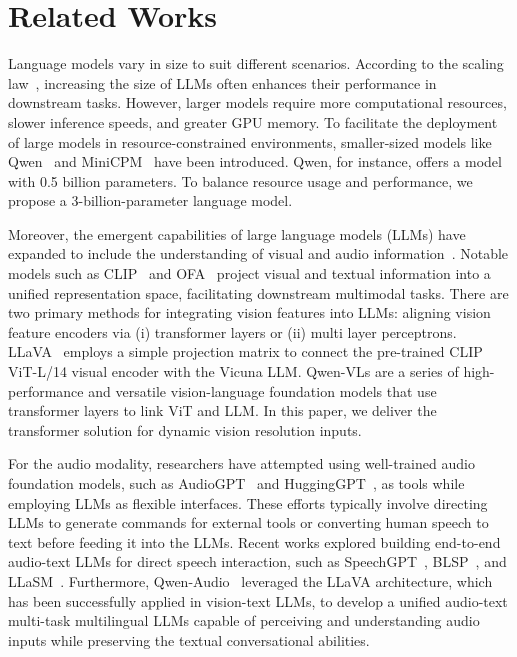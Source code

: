 \section{Related Works}
Language models vary in size to suit different scenarios. According to the scaling law~\cite{kaplan2020scaling}, increasing the size of LLMs often enhances their performance in downstream tasks. However, larger models require more computational resources, slower inference speeds, and greater GPU memory. To facilitate the deployment of large models in resource-constrained environments, smaller-sized models like Qwen~\cite{bai2023qwen, chu2023qwen, yang2024qwen2} and MiniCPM~\cite{hu2024minicpm} have been introduced. Qwen, for instance, offers a model with 0.5 billion parameters. To balance resource usage and performance, we propose a 3-billion-parameter language model. 


Moreover, the emergent capabilities of large language models (LLMs) have expanded to include the understanding of visual and audio information~\cite{flamingo, chen2022pali, li2023blip, huang2023language, peng2023kosmos, zhu2023minigpt, ye2023mplug, chen2023shikra, zhang2023video, sun2023generative}. Notable models such as CLIP~\cite{clip} and OFA~\cite{wang2022ofa} project visual and textual information into a unified representation space, facilitating downstream multimodal tasks. 
There are two primary methods for integrating vision features into LLMs: aligning vision feature encoders via (i) transformer layers or (ii) multi layer perceptrons. LLaVA~\cite{liu2023improvedllava, liu2024llavanext, liu2023llava} employs a simple projection matrix to connect the pre-trained CLIP ViT-L/14 visual encoder with the Vicuna LLM. Qwen-VLs are a series of high-performance and versatile vision-language foundation models that use transformer layers to link ViT and LLM. In this paper, we deliver the transformer solution for dynamic vision resolution inputs.

For the audio modality, researchers have attempted using well-trained audio foundation models, such as AudioGPT~\cite{huang2024audiogpt} and HuggingGPT~\cite{shen2024hugginggpt}, as tools while employing LLMs as flexible interfaces. These efforts typically involve directing LLMs to generate commands for external tools or converting human speech to text before feeding it into the LLMs. Recent works explored building end-to-end audio-text LLMs for direct speech interaction, such as SpeechGPT~\cite{zhang2023speechgpt}, BLSP~\cite{wang2024blspbootstrappinglanguagespeechpretraining}, and LLaSM~\cite{shu2023llasm}. Furthermore, Qwen-Audio~\cite{chu2023qwen} leveraged the LLaVA architecture, which has been successfully applied in vision-text LLMs, to develop a unified audio-text multi-task multilingual LLMs capable of perceiving and understanding audio inputs while preserving the textual conversational abilities.  

